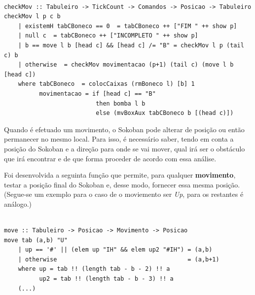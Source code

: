 \documentclass[12pt,a4paper]{report}
\begin{document}
\hfill

\begin{verbatim}

checkMov :: Tabuleiro -> TickCount -> Comandos -> Posicao -> Tabuleiro
checkMov l p c b
    | existemH tabCBoneco == 0  = tabCBoneco ++ ["FIM " ++ show p]
    | null c  = tabCBoneco ++ ["INCOMPLETO " ++ show p]
    | b == move l b [head c] && [head c] /= "B" = checkMov l p (tail c) b
    | otherwise  = checkMov movimentacao (p+1) (tail c) (move l b [head c])
    where tabCBoneco  = colocCaixas (rmBoneco l) [b] 1
          movimentacao = if [head c] == "B"
                          then bomba l b
                          else (mvBoxAux tabCBoneco b [(head c)])
\end{verbatim}

\hfill

\hfill

Quando é efetuado um movimento, o Sokoban pode alterar de posição ou então permanecer no mesmo local.
Para isso, é necessário saber, tendo em conta a posição do Sokoban e a direção para onde se vai mover, qual irá ser o obstáculo que irá encontrar e de que forma proceder de acordo com essa análise.

Foi desenvolvida a seguinta função que permite, para qualquer \textbf{movimento}, testar a posição final do Sokoban e, desse modo, fornecer essa mesma posição. (Segue-se um exemplo para o caso de o moviemento ser \emph{Up}, para os restantes é análogo.)\\


\begin{verbatim}

move :: Tabuleiro -> Posicao -> Movimento -> Posicao
move tab (a,b) "U"
    | up == '#' || (elem up "IH" && elem up2 "#IH") = (a,b)
    | otherwise                                     = (a,b+1)
    where up = tab !! (length tab - b - 2) !! a
          up2 = tab !! (length tab - b - 3) !! a
    (...)
\end{verbatim}
\end{document}
